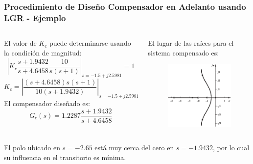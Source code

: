 \documentclass[aspectratio=169,handout]{beamer}
\theoremstyle{definition}
\theoremstyle{plain}
\theoremstyle{remark}
\begin{document}
\begin{frame}[c]\frametitle{Procedimiento de Diseño Compensador en Adelanto usando LGR - Ejemplo}
	\vspace*{2mm}
	\begin{columns}
		\begin{column}{0.5\textwidth}
			El valor de $K_c$ puede determinarse usando la condición de magnitud:
			\begin{equation*}
				\left| K_c \frac{s+1.9432}{s+4.6458} \frac{10}{s(s+1)}\right|_{s = -1.5+j2.5981} = 1
			\end{equation*}
			\pause
			\begin{equation*}
				K_c = \left| \frac{(s+4.6458)s(s+1)}{10(s+1.9432)} \right|_{s = -1.5+j2.5981} = 1.2287
			\end{equation*}
			\pause
			El compensador diseñado es:
			\begin{equation*}
				G_c(s) = 1.2287 \frac{s+1.9432}{s+4.6458}
			\end{equation*}
		\end{column}
		\begin{column}{0.5\textwidth}
			\pause
			El lugar de las raíces para el sistema compensado es:
			\begin{figure}
				\includegraphics[width=5cm]{images/ejemplo1_LGRcompensado.eps}
			\end{figure}
		\end{column}
	\end{columns}
	\pause
	El polo ubicado en $s=-2.65$ está muy cerca del cero en $s=-1.9432$, por lo cual su influencia en el transitorio es mínima.
\end{frame}
\end{document}
